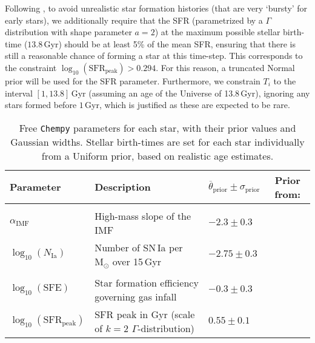\documentclass{aa}
\begin{document}
Following \citet{Philcox_2019}, to avoid unrealistic star formation histories (that are very `bursty' for early stars), we additionally require that the SFR (parametrized by a $\Gamma$ distribution with shape parameter $a=2$) at the maximum possible stellar birth-time ($13.8$\,Gyr) should be at least 5\% of the mean SFR, ensuring that there is still a reasonable chance of forming a star at this time-step. This corresponds to the constraint $\log_{10}\left(\mathrm{SFR}_\mathrm{peak}\right)>0.294$. For this reason, a truncated Normal prior will be used for the SFR parameter. Furthermore, we constrain $T_i$ to the interval $[1,13.8]$\,Gyr (assuming an age of the Universe of 13.8\,Gyr), ignoring any stars formed before $1$\,Gyr, which is justified as these are expected to be rare.
%
\begin{tiny}
\begin{table*}
\begin{minipage}{\textwidth}
\begin{center}
\caption{Free \texttt{Chempy} parameters for each star, with their prior values and Gaussian widths. Stellar birth-times are set for each star individually from a Uniform prior, based on realistic age estimates.}
\begin{tabularx}{\textwidth}{ >{\raggedleft}p{2.2cm}p{6.5cm}|C{1.9cm}C{2.cm} }
Parameter & Description & $\overline{\theta}_\mathrm{prior}\pm\sigma_\mathrm{prior}$ & Prior from: \\

 \hline
  \\
\hline
  $\alpha_\mathrm{IMF}$ & High-mass slope of the \citep{2003PASP..115..763C} IMF & $-2.3\pm0.3$ & \citep[Tab.\,1]{2003PASP..115..763C} \\
  
  $\log_{10}\left(N_\mathrm{Ia}\right)$ & Number of SN\,Ia per $\mathrm{M}_\odot$ over 15\,Gyr & $-2.75\pm0.3$ & \citep[Tab.1\,]{2012PASA...29..447M}\\
  
\hline
  \\
  
\hline
  $\log_{10}\left(\mathrm{SFE}\right)$ & Star formation efficiency governing gas infall & $-0.3\pm0.3$ & \citep{2008AJ....136.2846B}\\
  
  $\log_{10}\left(\mathrm{SFR}_\mathrm{peak}\right)$ & SFR peak in Gyr (scale of $k=2$ $\Gamma$-distribution) & $0.55\pm0.1$ & \citep[fig.\,4b]{2013ApJ...771L..35V}\\
  

\end{tabularx}
\end{center}
\end{minipage}
\end{table*}
\end{tiny}
\end{document}
